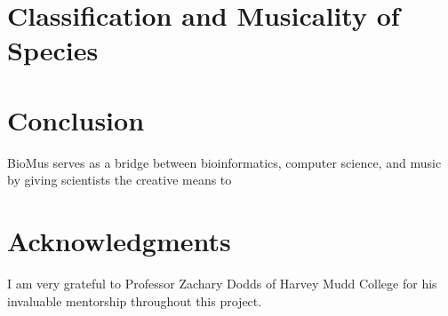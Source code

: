 \documentclass[letterpaper]{article}
\begin{document}
\section{Classification and Musicality of Species}

\section{Conclusion}
BioMus serves as a bridge between bioinformatics, computer science, and music by giving scientists the creative means to 


\section{Acknowledgments}

I am very grateful to Professor Zachary Dodds of Harvey Mudd College for his invaluable mentorship throughout this project.




\end{document}
